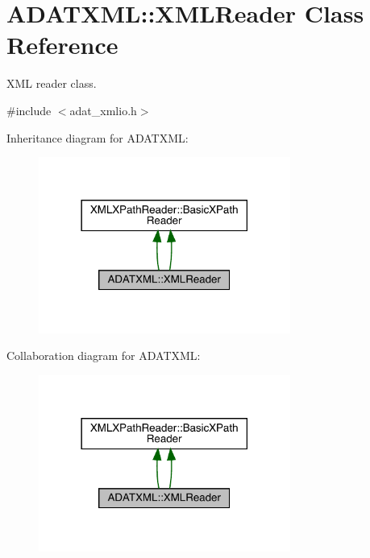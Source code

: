 \hypertarget{classADATXML_1_1XMLReader}{}\section{A\+D\+A\+T\+X\+ML\+:\+:X\+M\+L\+Reader Class Reference}
\label{classADATXML_1_1XMLReader}


X\+ML reader class.  




{\ttfamily \#include $<$adat\+\_\+xmlio.\+h$>$}



Inheritance diagram for A\+D\+A\+T\+X\+ML\+:\nopagebreak
\begin{figure}[H]
\begin{center}
\leavevmode
\includegraphics[width=234pt]{d6/dd2/classADATXML_1_1XMLReader__inherit__graph}
\end{center}
\end{figure}


Collaboration diagram for A\+D\+A\+T\+X\+ML\+:\nopagebreak
\begin{figure}[H]
\begin{center}
\leavevmode
\includegraphics[width=234pt]{d8/d60/classADATXML_1_1XMLReader__coll__graph}
\end{center}
\end{figure}
